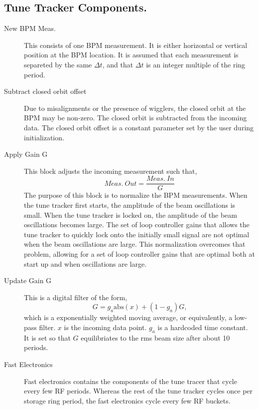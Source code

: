 \clearpage

\subsection{Tune Tracker Components.}
\begin{description}
\item[New BPM Meas.]  
This consists of one BPM measurement.  It is either horizontal or
vertical position at the BPM location.  It is assumed that each
measurement is separeted by the same $\Delta t$, and that $\Delta t$
is an integer multiple of the ring period.

\item[Subtract closed orbit offset]  
Due to misalignments or the presence of wigglers, the closed orbit at
the BPM may be non-zero.  The closed orbit is subtracted from the
incoming data.  The closed orbit offset is a constant parameter set by
the user during initialization.

\item[Apply Gain G]  This block adjusts the incoming measurement such that,
\begin{equation*}
Meas.\ Out = \frac{Meas.\ In}{G}
\end{equation*}
The purpose of this block is to normalize the BPM measurements.  When
the tune tracker first starts, the amplitude of the beam oscillations
is small.  When the tune tracker is locked on, the amplitude of the
beam oscillations becomes large.  The set of loop controller gains
that allows the tune tracker to quickly lock onto the initially small
signal are not optimal when the beam oscillations are large.  This
normalization overcomes that problem, allowing for a set of loop
controller gains that are optimal both at start up and when
oscillations are large.

\item[Update Gain G]  This is a digital filter of the form,
\begin{equation*}
G = g_a \textrm{abs}\left(x\right) + \left(1-g_a\right)G\textrm{,}
\end{equation*}
which is a exponentially weighted moving average, or equivalently, a
low-pass filter.  $x$ is the incoming data point.  $g_a$ is a
hardcoded time constant.  It is set so that $G$ equilibriates to the
rms beam size after about 10 periods.

\item[Fast Electronics]  
Fast electronics contains the components of the tune tracer that cycle
every few RF periods.  Whereas the rest of the tune tracker cycles
once per storage ring period, the fast electronics cycle every few RF
buckets.


\end{description}

